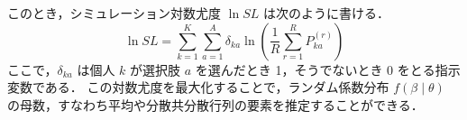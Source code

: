 このとき，シミュレーション対数尤度 $\ln SL$ は次のように書ける．
\begin{equation}
  \ln SL
  =
  \sum_{k=1}^{K}\sum_{a=1}^{A}
  \delta_{ka}\ln\left(
    \frac{1}{R}\sum_{r=1}^{R} P_{ka}^{(r)}
  \right)
\end{equation}
ここで，$\delta_{ka}$ は個人 $k$ が選択肢 $a$ を選んだとき 1，そうでないとき 0 をとる指示変数である．
この対数尤度を最大化することで，ランダム係数分布 $f(\beta \mid \theta)$ の母数，すなわち平均や分散共分散行列の要素を推定することができる．

